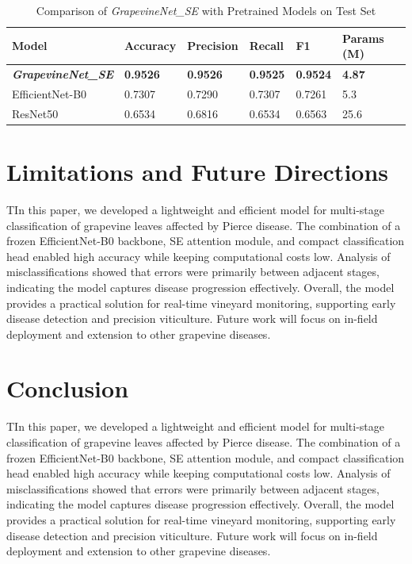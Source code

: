 \documentclass[conference]{IEEEtran}
\begin{document}
\begin{table}[h!]
\caption{Comparison of \textit{GrapevineNet\_SE} with Pretrained Models on Test Set}
\centering
\begin{tabular}{m{} m{} m{} m{} m{} m{} m{}}
\toprule
\textbf{Model} & \textbf{Accuracy} & \textbf{Precision} & \textbf{Recall} & \textbf{F1} & \textbf{Params (M)} \\
\midrule
\textbf{\textit{GrapevineNet\_SE}} & \textbf{0.9526} & \textbf{0.9526} & \textbf{0.9525} & \textbf{0.9524} & \textbf{4.87} \\
EfficientNet-B0 & 0.7307 & 0.7290 & 0.7307 & 0.7261 & 5.3 \\
ResNet50 & 0.6534 & 0.6816 & 0.6534 & 0.6563 & 25.6  \\
\bottomrule
\end{tabular}
\label{tab:model_comparison}
\end{table}

\section{Limitations and Future Directions}
\label{sec:ld}
TIn this paper, we developed a lightweight and efficient model for multi-stage classification of grapevine leaves affected by Pierce disease. The combination of a frozen EfficientNet-B0 backbone, SE attention module, and compact classification head enabled high accuracy while keeping computational costs low. Analysis of misclassifications showed that errors were primarily between adjacent stages, indicating the model captures disease progression effectively. Overall, the model provides a practical solution for real-time vineyard monitoring, supporting early disease detection and precision viticulture. Future work will focus on in-field deployment and extension to other grapevine diseases.

\section{Conclusion}
\label{sec:con}
TIn this paper, we developed a lightweight and efficient model for multi-stage classification of grapevine leaves affected by Pierce disease. The combination of a frozen EfficientNet-B0 backbone, SE attention module, and compact classification head enabled high accuracy while keeping computational costs low. Analysis of misclassifications showed that errors were primarily between adjacent stages, indicating the model captures disease progression effectively. Overall, the model provides a practical solution for real-time vineyard monitoring, supporting early disease detection and precision viticulture. Future work will focus on in-field deployment and extension to other grapevine diseases.

\vspace{12pt}
\color{black}



\end{document}
